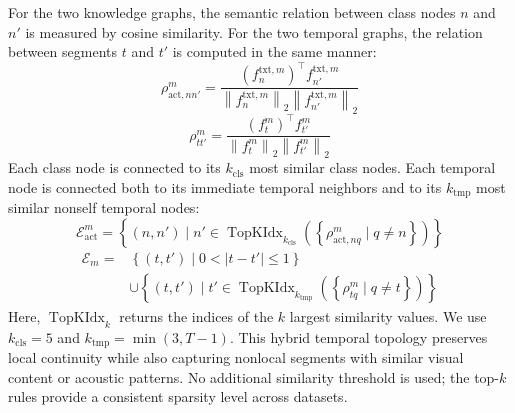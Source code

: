\documentclass[lettersize,journal]{IEEEtran}
\begin{document}
For the two knowledge graphs, the semantic relation between class nodes $n$ and $n'$ is measured by cosine similarity. For the two temporal graphs, the relation between segments $t$ and $t'$ is computed in the same manner:
\begin{equation}
\rho_{\mathrm{act},nn'}^m
=\frac{\left(f_n^{\mathrm{txt},m}\right)^{\top}f_{n'}^{\mathrm{txt},m}}{\left\|f_n^{\mathrm{txt},m}\right\|_2\left\|f_{n'}^{\mathrm{txt},m}\right\|_2}
\end{equation}
\begin{equation}
\rho_{tt'}^m
=\frac{\left(f_t^m\right)^{\top}f_{t'}^m}{\left\|f_t^m\right\|_2\left\|f_{t'}^m\right\|_2}
\end{equation}
Each class node is connected to its $k_{\mathrm{cls}}$ most similar class nodes. Each temporal node is connected both to its immediate temporal neighbors and to its $k_{\mathrm{tmp}}$ most similar nonself temporal nodes:
\begin{equation}
\mathcal{E}_{\mathrm{act}}^m=
\left\{(n,n')\mid n'\in\operatorname{TopKIdx}_{k_{\mathrm{cls}}}
\left(\left\{\rho_{\mathrm{act},nq}^m\mid q\ne n\right\}\right)\right\}
\end{equation}
\begin{equation}
\begin{aligned}
\mathcal{E}_m={}&\left\{(t,t')\mid 0<|t-t'|\le 1\right\}\\
&\cup\left\{(t,t')\mid t'\in\operatorname{TopKIdx}_{k_{\mathrm{tmp}}}
\left(\left\{\rho_{tq}^m\mid q\ne t\right\}\right)\right\}
\end{aligned}
\end{equation}
Here, $\operatorname{TopKIdx}_k$ returns the indices of the $k$ largest similarity values. We use $k_{\mathrm{cls}}=5$ and $k_{\mathrm{tmp}}=\min(3,T-1)$. This hybrid temporal topology preserves local continuity while also capturing nonlocal segments with similar visual content or acoustic patterns. No additional similarity threshold is used; the top-$k$ rules provide a consistent sparsity level across datasets.
\end{document}
